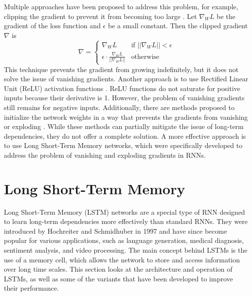 \documentclass{article}
\begin{document}
Multiple approaches have been proposed to address this problem, for example, clipping the
gradient to prevent it from becoming too large
\cite{pascanuDifficultyTrainingRecurrent2013}. Let $\nabla_W L$ be the gradient of the
loss function and $\epsilon$ be a small constant. Then the clipped gradient $\nabla$ is
\begin{equation}
  \nabla =
  \begin{cases}
    \nabla_W L                                       & \text{if } ||\nabla_W L|| < \epsilon \\
    \epsilon \cdot \frac{\nabla_W L}{||\nabla_W L||} & \text{otherwise}
  \end{cases}
\end{equation}
This technique prevents the gradient from growing indefinitely, but it does not solve the
issue of vanishing gradients. Another approach is to use Rectified Linear Unit (ReLU)
activation functions \cite{glorotDeepSparseRectifier2010}. ReLU functions do not saturate
for positive inputs because their derivative is 1. However, the problem of vanishing
gradients still remains for negative inputs. Additionally, there are methods proposed to
initialize the network weights in a way that prevents the gradients from vanishing or
exploding \cite{kumar2017weight}. While these methods can partially mitigate the issue of
long-term dependencies, they do not offer a complete solution. A more effective approach
is to use Long Short-Term Memory networks, which were specifically developed to address
the problem of vanishing and exploding gradients in RNNs.



\section{Long Short-Term Memory}
\label{ch:3}

Long Short-Term Memory (LSTM) networks are a special type of RNN designed to learn
long-term dependencies more effectively than standard RNNs. They were introduced by
Hochreiter and Schmidhuber in 1997 \cite{hochreiterLongShorttermMemory1997} and have since
become popular for various applications, such as language generation, medical diagnosis,
sentiment analysis, and video processing. The main concept behind LSTMs is the use of a
memory cell, which allows the network to store and access information over long time
scales. This section looks at the architecture and operation of LSTMs, as well as some of
the variants that have been developed to improve their performance.
\end{document}
